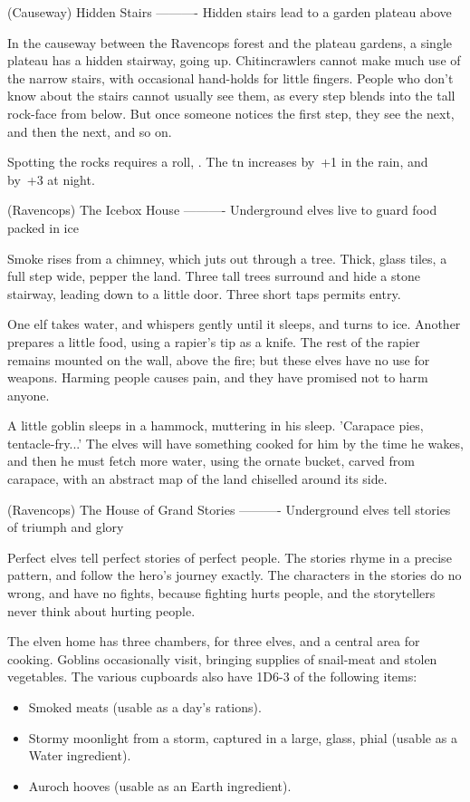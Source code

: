 (Causeway) Hidden Stairs
----------
{Hidden stairs lead to a garden plateau above}

In the causeway between the Ravencops forest and the plateau gardens, a single plateau has a hidden stairway, going up.
Chitincrawlers cannot make much use of the narrow stairs, with occasional hand-holds for little fingers.
People who don't know about the stairs cannot usually see them, as every step blends into the tall rock-face from below.
But once someone notices the first step, they see the next, and then the next, and so on.

Spotting the rocks requires a  roll, \tn[12].
The \gls{tn} increases by~+1 in the rain, and by~+3 at night.

(Ravencops) The Icebox House
----------
{Underground elves live to guard food packed in ice}

Smoke rises from a chimney, which juts out through a tree.
Thick, glass tiles, a full step wide, pepper the land.
Three tall trees surround and hide a stone stairway, leading down to a little door.
Three short taps permits entry.

One elf takes water, and whispers gently until it sleeps, and turns to ice.
Another prepares a little food, using a rapier's tip as a knife.
The rest of the rapier remains mounted on the wall, above the fire; but these elves have no use for weapons.
Harming people causes pain, and they have promised not to harm anyone.

A little goblin sleeps in a hammock, muttering in his sleep.
'Carapace pies, tentacle-fry...'
The elves will have something cooked for him by the time he wakes, and then he must fetch more water, using the ornate bucket, carved from carapace, with an abstract map of the land chiselled around its side.

(Ravencops) The House of Grand Stories
----------
{Underground elves tell stories of triumph and glory}

Perfect elves tell perfect stories of perfect people.
The stories rhyme in a precise pattern, and follow the hero's journey exactly.
The characters in the stories do no wrong, and have no fights, because fighting hurts people, and the storytellers never think about hurting people.

The elven home has three chambers, for three elves, and a central area for cooking.
Goblins occasionally visit, bringing supplies of snail-meat and stolen vegetables.
The various cupboards also have 1D6-3 of the following items:

\begin{itemize}
  \item
  Smoked meats (usable as a day's rations).
  \item
  Stormy moonlight from a storm, captured in a large, glass, phial (usable as a Water \gls{ingredient}).
  \item
  Auroch hooves (usable as an Earth \gls{ingredient}).
\end{itemize}

